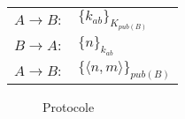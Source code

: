 \documentclass[10pt,a4paper]{article}
\begin{document}
\begin{table}[!h]
\centering
\begin{tabular}{ll}
$A \rightarrow B:$ & $\{k_{ab}\}_{K_{pub(B)}}$ \\
$B \rightarrow A:$ & $\{n\}_{k_{ab}}$ \\
$A \rightarrow B:$ & $\{ \langle n, m \rangle \}_{pub(B)}$
\end{tabular}
\end{table}


\begin{figure}[!ht]
\centering
\begin{msc}{Protocole}
  \nextlevel
  \nextlevel
  \nextlevel
  \nextlevel
\end{msc}
\end{figure}
\end{document}
